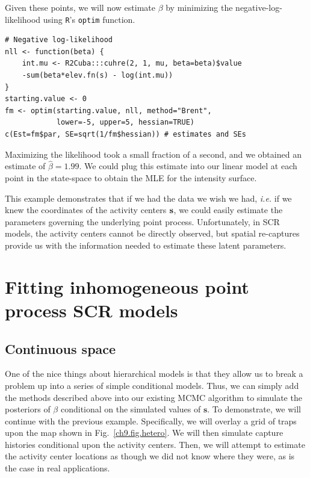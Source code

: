Given these points, we will now estimate $\beta$ by minimizing the
negative-log-likelihood using \verb+R+'s \verb+optim+ function.

\begin{small}
\begin{verbatim}
# Negative log-likelihood
nll <- function(beta) {
    int.mu <- R2Cuba:::cuhre(2, 1, mu, beta=beta)$value
    -sum(beta*elev.fn(s) - log(int.mu))
}
starting.value <- 0
fm <- optim(starting.value, nll, method="Brent",
            lower=-5, upper=5, hessian=TRUE)
c(Est=fm$par, SE=sqrt(1/fm$hessian)) # estimates and SEs
\end{verbatim}
\end{small}


Maximizing the likelihood took a small fraction of a second, and we
obtained an estimate of $\hat{\beta}=1.99$. We could plug
this estimate into our linear model at each point in the state-space to
obtain the MLE for the intensity surface.

This example demonstrates
that if we had the data we wish we had, {\it i.e.} if we knew the
coordinates of the activity centers $\bf s$, we could easily estimate the
parameters governing the underlying point process. Unfortunately, in
SCR models, the activity centers cannot be directly observed, but
spatial re-captures provide us with the information needed to
estimate these latent parameters.

\section{Fitting inhomogeneous point process SCR models}

\subsection{Continuous space}

One of the nice things about hierarchical models is that they allow us
to break a problem up into a series of simple conditional
models. Thus,
we can simply add the methods described above into our existing MCMC
algorithm to simulate the posteriors of $\beta$ conditional on the
simulated values of $\mathbf{s}$. To demonstrate, we will continue with
the previous example. Specifically, we will overlay a grid of
traps upon the map shown in Fig.~\ref{ch9.fig.hetero}. We will then
simulate capture histories conditional upon the activity
centers. Then, we will attempt to estimate the activity center
locations as though we did not know where they were, as is the case in
real applications.

